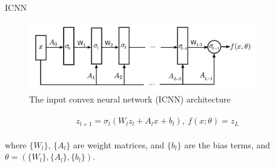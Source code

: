 \documentclass{beamer}		%
\begin{document}












\begin{frame}{ICNN}

\begin{figure}
\includegraphics[height=3cm]{figure3.png}
\caption{The input convex neural network (ICNN) architecture}
\end{figure}

\begin{eqnarray}
\begin{aligned}
z_{l+1}=\sigma_l(W_lz_l+A_lx+b_l),\ f(x;\theta)=z_L
\end{aligned}    
\end{eqnarray}

where $\{W_l\}$, $\{A_l\}$ are weight matrices, and $\{b_l\}$ are the bias terms, and $\theta = (\{W_l\}, \{A_l\}, \{b_l\})$.

\end{frame}
\end{document}
